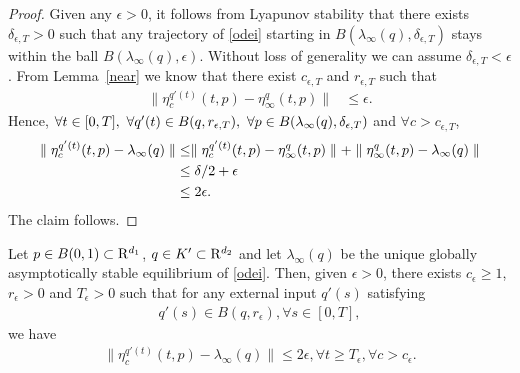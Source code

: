 \begin{proof}
Given any $\epsilon >0$, it follows from Lyapunov stability that there exists $\delta_{\epsilon,T}>0$ such that any trajectory of \eqref{odei} starting in $B(\lambda_\infty(q),\delta_{\epsilon,T})$ stays within the ball $B(\lambda_\infty(q),\epsilon)$. Without loss of generality we can assume $\delta_{\epsilon,T}<\epsilon$. From Lemma~\ref{near} we know that there exist $c_{\epsilon,T}$ and $r_{\epsilon,T}$ such that
\begin{align}
\parallel \eta^{q'(t)}_c(t,p)-\eta^{q}_\infty(t,p)\parallel&\leq \epsilon.
\end{align}
Hence, $\forall t \in [0,T],\mbox{ } \forall q'(t)\in B(q,r_{\epsilon,T}), \mbox{ }\forall p \in B(\lambda_\infty(q),\delta_{\epsilon,T})$ and $\forall c> c_{\epsilon,T}$,
\begin{align}
\parallel \eta^{q'(t)}_c(t,p)-\lambda_\infty(q)\parallel &\leq \parallel \eta^{q'(t)}_c(t,p)-\eta^{q}_\infty
(t,p)\parallel + \parallel \eta^{q}_\infty(t,p)-\lambda_\infty(q)\parallel \nonumber\\
&\leq \delta/2+\epsilon\nonumber\\
&\leq 2\epsilon.
\end{align}
The claim follows.
\end{proof}
\begin{lemma}\label{neartraj}
 Let $p\in B(0,1) \subset \mathrm{R}^{d_1}$, $q\in K'\subset\mathrm{R}^{d_2}$ and let $\lambda_\infty(q)$ be the unique globally asymptotically stable equilibrium of \eqref{odei}. Then, given $\epsilon > 0$, there exists $c_\epsilon\geq 1$, $r_{\epsilon}>0$ and $T_\epsilon>0$ such that for any external input $q'(s)$ satisfying
\begin{align}\label{qcond}
q'(s) \in B(q,r_{\epsilon}), \forall s\in [0,T],
\end{align}
we have
\begin{align}
\parallel \eta^{q'(t)}_c(t,p)-\lambda_\infty(q)\parallel \leq 2\epsilon, \forall t\geq T_\epsilon, 
\forall c>c_\epsilon.
\end{align}
\end{lemma}
